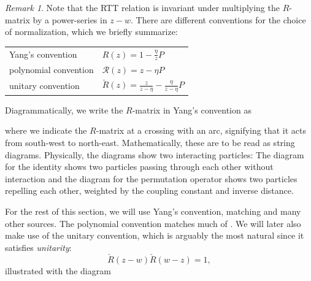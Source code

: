 \documentclass[11pt]{report}
\theoremstyle{definition}
\theoremstyle{remark}
\newtheorem*{remark}{Remark}
\theoremstyle{remark}
\begin{document}
\begin{remark}
Note that the RTT relation is invariant under multiplying the $R$-matrix by a power-series in $z-w$. There are different conventions for the choice of normalization, which we briefly summarize:
\begin{center}
\begin{tabular}{|l||l|}
\hline
Yang's convention & $R(z) = 1 - \frac{\eta}{z} P$ \\
polynomial convention & $\mathcal{R}(z) = z - \eta P$ \\
unitary convention & $\check R(z) = \frac{z}{z-\eta} - \frac{\eta}{z-\eta} P$ \\
\hline
\end{tabular}
\end{center}
Diagrammatically, we write the $R$-matrix in Yang's convention as
~\\
\begin{center}
\end{center}
where we indicate the $R$-matrix at a crossing with an arc, signifying that it acts from south-west to north-east. Mathematically, these are to be read as string diagrams. Physically, the diagrams show two interacting particles: The diagram for the identity shows two particles passing through each other without interaction and the diagram for the permutation operator shows two particles repelling each other, weighted by the coupling constant and inverse distance.

For the rest of this section, we will use Yang's convention, matching \cite{book:molev} and many other sources. The polynomial convention matches much of \cite{book:arutyunov:betheAnsatz}. We will later also make use of the unitary convention, which is arguably the most natural since it satisfies \emph{unitarity}:
\begin{equation*}
\check R(z-w) \check{R}(w-z) = 1,
\end{equation*}
illustrated with the diagram
~\\
\begin{center}
\end{center}
\end{remark}
\end{document}
